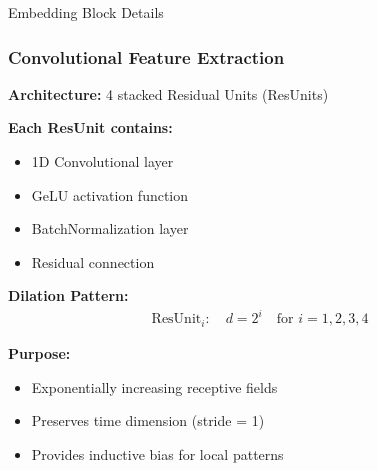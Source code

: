 \documentclass{beamer}
\begin{document}
\begin{frame}{Embedding Block Details}
\frametitle{Convolutional Feature Extraction}

\textbf{Architecture:} 4 stacked Residual Units (ResUnits)

\textbf{Each ResUnit contains:}
\begin{itemize}
    \item 1D Convolutional layer
    \item GeLU activation function
    \item BatchNormalization layer
    \item Residual connection
\end{itemize}

\vspace{0.3cm}

\textbf{Dilation Pattern:}
\begin{align}
\text{ResUnit}_i: \quad d = 2^i \quad \text{for } i = 1, 2, 3, 4
\end{align}

\textbf{Purpose:}
\begin{itemize}
    \item Exponentially increasing receptive fields
    \item Preserves time dimension (stride = 1)
    \item Provides inductive bias for local patterns
\end{itemize}

\vspace{0.3cm}


\end{frame}
\end{document}
